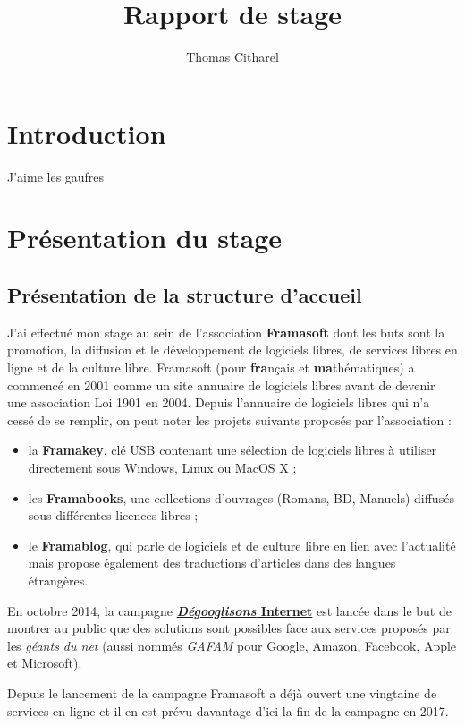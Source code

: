 \documentclass[10pt,a4paper]{report}
\author{Thomas Citharel}
\title{Rapport de stage}
\begin{document}
	\maketitle
	\tableofcontents
	\chapter*{Introduction}
	J'aime les gaufres
	\chapter{Présentation du stage}
	\section{Présentation de la structure d'accueil}
	J'ai effectué mon stage au sein de l'association \textbf{Framasoft} dont les buts sont la promotion, la diffusion et le développement de logiciels libres, de services libres en ligne et de la culture libre. Framasoft (pour \textbf{fra}nçais et \textbf{ma}thématiques) a commencé en 2001 comme un site annuaire de logiciels libres avant de devenir une association Loi 1901 en 2004. Depuis l'annuaire de logiciels libres qui n'a cessé de se remplir, on peut noter les projets suivants proposés par l'association :
	\begin{itemize}
		\item la \textbf{Framakey}, clé USB contenant une sélection de logiciels libres à utiliser directement sous Windows, Linux ou MacOS X ;
		\item les \textbf{Framabooks}, une collections d'ouvrages (Romans, BD, Manuels) diffusés sous différentes licences libres ;
		\item le \textbf{Framablog}, qui parle de logiciels et de culture libre en lien avec l'actualité mais propose également des traductions d'articles dans des langues étrangères.
	\end{itemize}
	
	En octobre 2014, la campagne \href{https://degooglisons-internet.org/}{\textbf{\textit{Dégooglisons} Internet}} est lancée dans le but de montrer au public que des solutions sont possibles face aux services proposés par les \textit{géants du net} (aussi nommés \textit{GAFAM} pour Google, Amazon, Facebook, Apple et Microsoft).
	
	Depuis le lancement de la campagne Framasoft a déjà ouvert une vingtaine de services en ligne et il en est prévu davantage d'ici la fin de la campagne en 2017.
	
\end{document}
